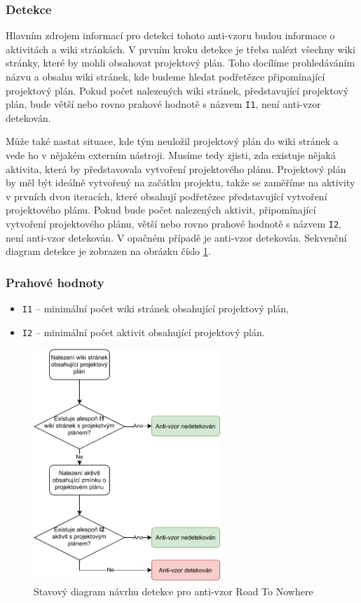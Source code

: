 \documentclass[czech,DP]{thesiskiv}
\begin{document}
\subsubsection{Detekce}
Hlavním zdrojem informací pro detekci tohoto anti-vzoru budou informace o aktivitách a wiki stránkách. V prvním kroku detekce je třeba nalézt všechny wiki stránky, které by mohli obsahovat projektový plán. Toho docílíme prohledáváním názvu a obsahu wiki stránek, kde budeme hledat podřetězce připomínající projektový plán. Pokud počet nalezených wiki stránek, představující projektový plán, bude větší nebo rovno prahové hodnotě s názvem \texttt{I1}, není anti-vzor detekován.
\par
Může také nastat situace, kde tým neuložil projektový plán do wiki stránek a vede ho v nějakém externím nástroji. Musíme tedy zjisti, zda existuje nějaká aktivita, která by představovala vytvoření projektového plánu. Projektový plán by měl být ideálně vytvořený na začátku projektu, takže se zaměříme na aktivity v prvních dvou iteracích, které obsahují podřetězec představující vytvoření projektového plánu. Pokud bude počet nalezených aktivit, připomínající vytvoření projektového plánu, větší nebo rovno prahové hodnotě s názvem \texttt{I2}, není anti-vzor detekován. V opačném případě je anti-vzor detekován. Sekvenční diagram detekce je zobrazen na obrázku číslo \ref{img:road_to_nowhere}.
\subsubsection{Prahové hodnoty}
\begin{itemize}
    \item \texttt{I1} -- minimální počet wiki stránek obsahující projektový plán,
    \item \texttt{I2} -- minimální počet aktivit obsahující projektový plán. 
\end{itemize}
\begin{figure}[!htb]
    \centering
    \includegraphics[width=200pt]{img/road_to_nowhere.pdf}
    \caption{Stavový diagram návrhu detekce pro anti-vzor Road To Nowhere}
    \label{img:road_to_nowhere}
\end{figure}
\FloatBarrier
\end{document}

